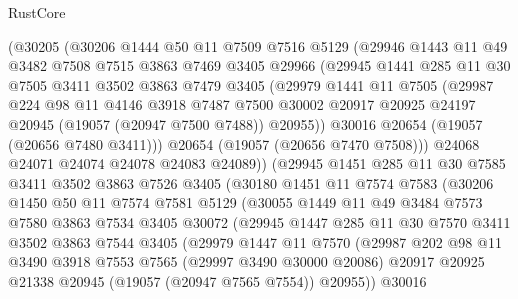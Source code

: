 \begin{lexlean}{RustCore}
\begin{coremodule}
      (@30205
        (@30206
          @1444
          @50
          @11
          @7509
          @7516
          @5129
          (@29946
            @1443
            @11
            @49
            @3482
            @7508
            @7515
            @3863
            @7469
            @3405
            @29966
            (@29945
              @1441
              @285
              @11
              @30
              @7505
              @3411
              @3502
              @3863
              @7479
              @3405
              (@29979
                @1441
                @11
                @7505
                (@29987
                  @224
                  @98
                  @11
                  @4146
                  @3918
                  @7487
                  @7500
                  @30002
                  @20917
                  @20925
                  @24197
                  @20945
                  (@19057 (@20947 @7500 @7488))
                  @20955))
              @30016
              @20654
              (@19057 (@20656 @7480 @3411)))
            @20654
            (@19057 (@20656 @7470 @7508)))
          @24068
          @24071
          @24074
          @24078
          @24083
          @24089))
      (@29945
        @1451
        @285
        @11
        @30
        @7585
        @3411
        @3502
        @3863
        @7526
        @3405
        (@30180
          @1451
          @11
          @7574
          @7583
          (@30206
            @1450
            @50
            @11
            @7574
            @7581
            @5129
            (@30055
              @1449
              @11
              @49
              @3484
              @7573
              @7580
              @3863
              @7534
              @3405
              @30072
              (@29945
                @1447
                @285
                @11
                @30
                @7570
                @3411
                @3502
                @3863
                @7544
                @3405
                (@29979
                  @1447
                  @11
                  @7570
                  (@29987
                    @202
                    @98
                    @11
                    @3490
                    @3918
                    @7553
                    @7565
                    (@29997 @3490 @30000 @20086)
                    @20917
                    @20925
                    @21338
                    @20945
                    (@19057 (@20947 @7565 @7554))
                    @20955))
                @30016

\end{coremodule}
\end{lexlean}
